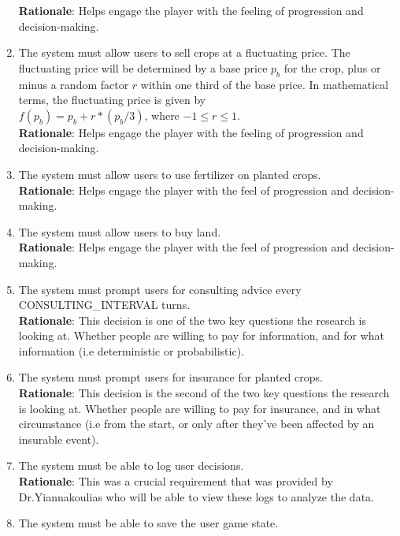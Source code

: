 \documentclass{article}
\begin{document}
\begin{enumerate}[{FR}1. ]
    \textbf{Rationale}: Helps engage the player with the feeling of progression and decision-making.
    \item \label{FR8} The system must allow users to sell crops at a fluctuating price. The fluctuating price will be determined by a base price $p_b$ for the crop, plus or minus a random factor $r$ within one third of the base price. In mathematical terms, the fluctuating price is given by \\ $f(p_b) = p_b + r*(p_b/3)$, where $-1 \le r \le 1$.\\
    \textbf{Rationale}: Helps engage the player with the feeling of progression and decision-making.
    \item \label{FR9} The system must allow users to use fertilizer on planted crops.\\
    \textbf{Rationale}: Helps engage the player with the feel of progression and decision-making.
    \item \label{FR10} The system must allow users to buy land.\\
    \textbf{Rationale}: Helps engage the player with the feel of progression and decision-making.
    \item \label{FR11} The system must prompt users for consulting advice every CONSULTING\_INTERVAL turns.\\
    \textbf{Rationale}: This decision is one of the two key questions the research is looking at. Whether people are willing to pay for information, and for what information (i.e deterministic or probabilistic).
    \item \label{FR12} The system must prompt users for insurance for planted crops.\\
    \textbf{Rationale}: This decision is the second of the two key questions the research is looking at. Whether people are willing to pay for insurance, and in what circumstance (i.e from the start, or only after they've been affected by an insurable event).
    \item \label{FR13} The system must be able to log user decisions.\\
    \textbf{Rationale}: This was a crucial requirement that was provided by Dr.Yiannakoulias who will be able to view these logs to analyze the data.
    \item \label{FR14} The system must be able to save the user game state.\\

\end{enumerate}
\end{document}
